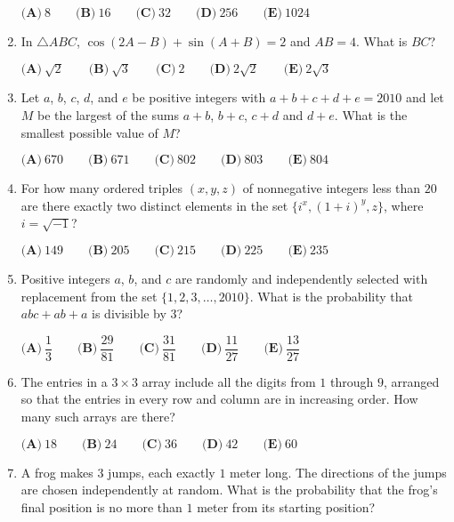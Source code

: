 \documentclass{article}
\begin{document}
\begin{enumerate}[label=\arabic*., itemsep=0.5em]
\(\textbf{(A)}\ 8 \qquad \textbf{(B)}\ 16 \qquad \textbf{(C)}\ 32 \qquad \textbf{(D)}\ 256 \qquad \textbf{(E)}\ 1024\)\par \vspace{0.5em}\item In \(\triangle ABC\), \(\cos(2A-B)+\sin(A+B)=2\) and \(AB=4\). What is \(BC\)?

\(\textbf{(A)}\ \sqrt{2} \qquad \textbf{(B)}\ \sqrt{3} \qquad \textbf{(C)}\ 2 \qquad \textbf{(D)}\ 2\sqrt{2} \qquad \textbf{(E)}\ 2\sqrt{3}\)\par \vspace{0.5em}\item Let \(a\), \(b\), \(c\), \(d\), and \(e\) be positive integers with \(a+b+c+d+e=2010\) and let \(M\) be the largest of the sums \(a+b\), \(b+c\), \(c+d\) and \(d+e\). What is the smallest possible value of \(M\)?

\(\textbf{(A)}\ 670 \qquad \textbf{(B)}\ 671 \qquad \textbf{(C)}\ 802 \qquad \textbf{(D)}\ 803 \qquad \textbf{(E)}\ 804\)\par \vspace{0.5em}\item For how many ordered triples \((x,y,z)\) of nonnegative integers less than \(20\) are there exactly two distinct elements in the set \(\{i^x, (1+i)^y, z\}\), where \(i=\sqrt{-1}\)?

\(\textbf{(A)}\ 149 \qquad \textbf{(B)}\ 205 \qquad \textbf{(C)}\ 215 \qquad \textbf{(D)}\ 225 \qquad \textbf{(E)}\ 235\)\par \vspace{0.5em}\item Positive integers \(a\), \(b\), and \(c\) are randomly and independently selected with replacement from the set \(\{1, 2, 3,\dots, 2010\}\). What is the probability that \(abc + ab + a\) is divisible by \(3\)?

\(\textbf{(A)}\ \dfrac{1}{3} \qquad \textbf{(B)}\ \dfrac{29}{81} \qquad \textbf{(C)}\ \dfrac{31}{81} \qquad \textbf{(D)}\ \dfrac{11}{27} \qquad \textbf{(E)}\ \dfrac{13}{27}\)\par \vspace{0.5em}\item The entries in a \(3 \times 3\) array include all the digits from \(1\) through \(9\), arranged so that the entries in every row and column are in increasing order. How many such arrays are there?

\(\textbf{(A)}\ 18 \qquad \textbf{(B)}\ 24 \qquad \textbf{(C)}\ 36 \qquad \textbf{(D)}\ 42 \qquad \textbf{(E)}\ 60\)\par \vspace{0.5em}\item A frog makes \(3\) jumps, each exactly \(1\) meter long. The directions of the jumps are chosen independently at random. What is the probability that the frog's final position is no more than \(1\) meter from its starting position?


\end{enumerate}
\end{document}
